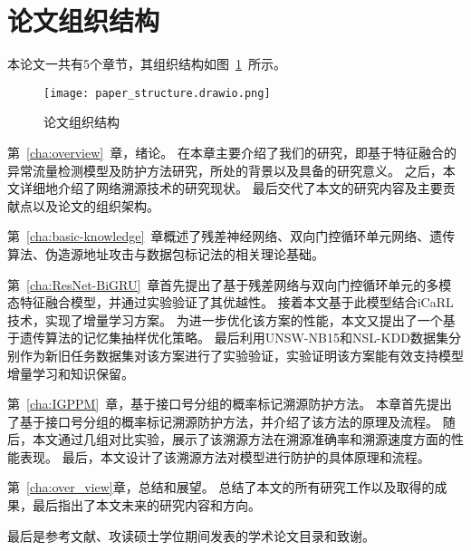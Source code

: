 


\section{论文组织结构}
本论文一共有5个章节，其组织结构如图~\ref{fig:paper_structure}~所示。
\begin{figure}[htbp]
  \centering
  \texttt{[image: paper\_structure.drawio.png]}
  \caption{论文组织结构}
  \label{fig:paper_structure}
\end{figure}

第~\ref{cha:overview}~章，绪论。
在本章主要介绍了我们的研究，即基于特征融合的异常流量检测模型及防护方法研究，所处的背景以及具备的研究意义。
之后，本文详细地介绍了网络溯源技术的研究现状。
最后交代了本文的研究内容及主要贡献点以及论文的组织架构。


第~\ref{cha:basic-knowledge}~章概述了残差神经网络、双向门控循环单元网络、遗传算法、伪造源地址攻击与数据包标记法的相关理论基础。



第~\ref{cha:ResNet-BiGRU}~章首先提出了基于残差网络与双向门控循环单元的多模态特征融合模型，并通过实验验证了其优越性。
接着本文基于此模型结合iCaRL技术，实现了增量学习方案。
为进一步优化该方案的性能，本文又提出了一个基于遗传算法的记忆集抽样优化策略。
最后利用UNSW-NB15和NSL-KDD数据集分别作为新旧任务数据集对该方案进行了实验验证，实验证明该方案能有效支持模型增量学习和知识保留。

第~\ref{cha:IGPPM}~章，基于接口号分组的概率标记溯源防护方法。
本章首先提出了基于接口号分组的概率标记溯源防护方法，并介绍了该方法的原理及流程。
随后，本文通过几组对比实验，展示了该溯源方法在溯源准确率和溯源速度方面的性能表现。
最后，本文设计了该溯源方法对模型进行防护的具体原理和流程。



第~\ref{cha:over_view}章，总结和展望。
总结了本文的所有研究工作以及取得的成果，最后指出了本文未来的研究内容和方向。

最后是参考文献、攻读硕士学位期间发表的学术论文目录和致谢。
